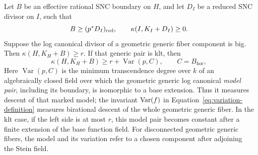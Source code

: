 \begin{proposition}
\label{num:model-pair}
Let $B$ be an effective rational SNC boundary on $H$, and let $D_I$
be a reduced SNC divisor on $I$, such that
\[
 B\geq(p^*D_I)_{\mathrm{red}},\qquad \kappa(I,K_I+D_I)\geq0.
\]
Suppose the log canonical divisor of a geometric generic fiber
component is big. Then $\kappa(H,K_H+B)\geq r$. If that generic pair
is klt, then
\begin{equation}\label{num:KP}
 \kappa(H,K_H+B)\geq r+\operatorname{Var}(p,C),
 \qquad C=B_{\mathrm{hor}},
\end{equation}
Here $\operatorname{Var}(p,C)$ is the minimum transcendence degree
over $k$ of an algebraically closed field over which the geometric
generic log canonical \emph{model pair}, including its boundary, is
isomorphic to a base extension. Thus it measures descent of that
marked model; the invariant $\operatorname{Var}(f)$ in
Equation~\eqref{eq:variation-definition} measures birational descent
of the whole geometric generic fiber.
In the klt case, if the left side is at most $r$, this model pair
becomes constant after a finite extension of the base function field. For disconnected
geometric generic fibers, the model and its variation refer to a chosen
component after adjoining the Stein field.
\end{proposition}

